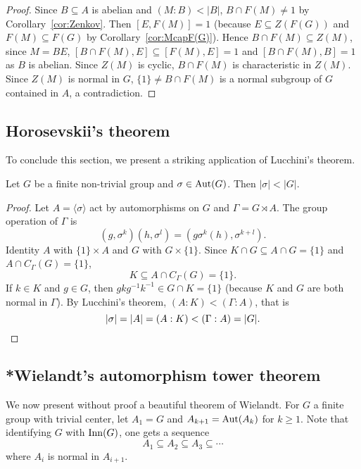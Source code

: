 \begin{proof}
	\medskip
	Since $B\subseteq A$ is abelian and $(M:B)<|B|$, $B\cap F(M)\ne1$ by Corollary~\ref{cor:Zenkov}. Then $[E,F(M)]=1$ (because $E\subseteq
	Z(F(G))$ and $F(M)\subseteq F(G)$ by Corollary~\ref{cor:McapF(G)}).
	Hence $B\cap F(M)\subseteq Z(M)$, since $M=BE$, $[B\cap F(M),E]\subseteq
	[F(M),E]=1$ and $[B\cap F(M),B]=1$ as $B$ is abelian. Since 
	$Z(M)$ is cyclic, $B\cap F(M)$ is characteristic in $Z(M)$. Since 
	$Z(M)$ is normal in $G$, $\{1\}\ne B\cap F(M)$ is a normal subgroup of $G$
	contained in $A$, a contradiction. 
\end{proof}

\subsection{Horosevskii's theorem}

To conclude this section, we present a striking application of Lucchini's theorem.

\begin{corollary}[Horosevskii]
	Let $G$ be a finite non-trivial group and $\sigma\in\operatorname{Aut}(G)$. Then 
	$|\sigma|<|G|$.
\end{corollary}

\begin{proof}
	Let $A=\langle\sigma\rangle$ act by automorphisms on $G$ and 
	 $\Gamma=G\rtimes A$. The group operation of $\Gamma$ is 
	\[
	(g,\sigma^k)(h,\sigma^l)=(g\sigma^k(h),\sigma^{k+l}).
	\]
	Identity $A$ with $\{1\}\times A$ and $G$ with $G\times\{1\}$. 
	Since $K\cap G\subseteq A\cap G=\{1\}$ and $A\cap C_{\Gamma}(G)=\{1\}$, 
	\[
		K\subseteq A\cap C_{\Gamma}(G)=\{1\}.
	\]
	If $k\in K$ and $g\in G$, then $gkg^{-1}k^{-1}\in G\cap K=\{1\}$ (because
	$K$ and $G$ are both normal in $\Gamma$). By Lucchini's theorem, 
    $(A:K)<(\Gamma:A)$, that is
	\[
		|\sigma|=|A|=(A:K)<(\Gamma:A)=|G|.\qedhere
	\]
\end{proof}

\subsection{*Wielandt's automorphism tower theorem}

We now present without proof a beautiful theorem of Wielandt. 
For $G$ a finite group with trivial center, let 
$A_1=G$ and $A_{k+1}=\operatorname{Aut}(A_k)$ for $k\geq1$. Note that 
identifying $G$ with $\mathrm{Inn}(G)$, one gets a sequence
\begin{equation}
\label{eq:automorphism_groups}
A_1\subseteq A_2\subseteq A_3\subseteq\cdots 
\end{equation}
where $A_i$ is normal in $A_{i+1}$. 

